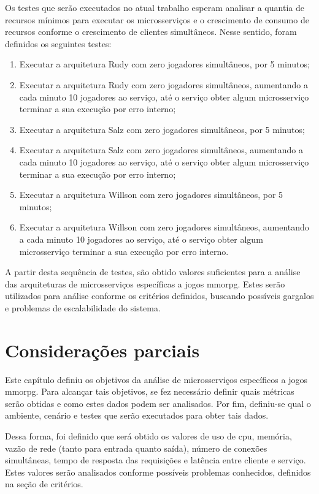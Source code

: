 Os testes que serão executados no atual trabalho esperam analisar a quantia de recursos mínimos para executar os microsserviços e o crescimento de consumo de recursos conforme o crescimento de clientes simultâneos.
%
Nesse sentido, foram definidos os seguintes testes:

\begin{enumerate}
  \item Executar a arquitetura Rudy com zero jogadores simultâneos, por 5 minutos;
  \item Executar a arquitetura Rudy com zero jogadores simultâneos, aumentando a cada minuto 10 jogadores ao serviço, até o serviço obter algum microsserviço terminar a sua execução por erro interno;
  \item Executar a arquitetura Salz com zero jogadores simultâneos, por 5 minutos;
  \item Executar a arquitetura Salz com zero jogadores simultâneos, aumentando a cada minuto 10 jogadores ao serviço, até o serviço obter algum microsserviço terminar a sua execução por erro interno;
  \item Executar a arquitetura Willson com zero jogadores simultâneos, por 5 minutos;
  \item Executar a arquitetura Willson com zero jogadores simultâneos, aumentando a cada minuto 10 jogadores ao serviço, até o serviço obter algum microsserviço terminar a sua execução por erro interno.
\end{enumerate}

A partir desta sequência de testes, são obtido valores suficientes para a análise das arquiteturas de microsserviços específicas a jogos \ac{mmorpg}.
%
Estes serão utilizados para análise conforme os critérios definidos, buscando possíveis gargalos e problemas de escalabilidade do sistema.


\section{Considerações parciais}


Este capítulo definiu os objetivos da análise de microsserviços específicos a jogos \ac{mmorpg}.
%
Para alcançar tais objetivos, se fez necessário definir quais métricas serão obtidas e como estes dados podem ser analisados.
%
Por fim, definiu-se qual o ambiente, cenário e testes que serão executados para obter tais dados.

Dessa forma, foi definido que será obtido os valores de uso de \ac{cpu}, memória, vazão de rede (tanto para entrada quanto saída), número de conexões simultâneas, tempo de resposta das requisições e latência entre cliente e serviço.
%
Estes valores serão analisados conforme possíveis problemas conhecidos, definidos na seção de critérios.

